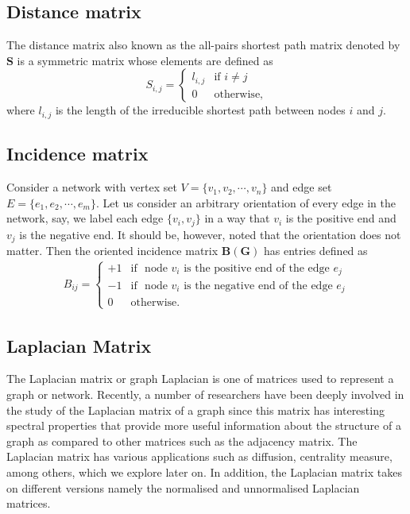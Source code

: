 \documentclass[10pt,a4paper]{article}
\begin{document}
\subsection{Distance matrix}
The distance matrix also known as the all-pairs shortest path matrix denoted by $\mathbf{S}$ is a symmetric matrix whose elements are defined as 
\begin{equation}
	S_{i,j} =  \begin{cases} l_{i,j} &\mbox{if } i \neq j \\
0 & \text{otherwise},
\end{cases}
\end{equation}
where $l_{i,j}$ is the length of the irreducible shortest path between nodes $i$ and $j$.

\subsection{Incidence matrix}
	Consider a network with vertex set $V=\{v_1,v_2, \cdots,v_n\}$ and edge set $E =\{e_1,e_2,\cdots,e_m \}$. Let us consider an arbitrary orientation of every edge in the network, say, we label each edge $\{v_i,v_j\}$ in a way that $v_i$ is the positive end and $v_j$ is the negative end. It should be, however, noted that the orientation does not matter. Then the oriented incidence matrix $\mathbf{B(G)}$ has entries defined as
	\begin{eqnarray}
	B_{ij} = \begin{cases} +1 &\mbox{if } \text{ node $v_i$ is the positive end of the edge } e_j \\
	-1 &\mbox{if }  \text{ node $v_i$ is the negative end of the edge } e_j\\
	0 & \text{otherwise}.
	\end{cases}
	\end{eqnarray}

\subsection{Laplacian Matrix}
The Laplacian matrix or graph Laplacian is one of matrices used to represent a graph or network. Recently, a number of researchers have been deeply involved in the study of the Laplacian matrix of a graph since this matrix has interesting spectral properties that provide more useful information about the structure of a graph as compared to other matrices such as the adjacency matrix. The Laplacian matrix has various applications such as diffusion, centrality measure, among others, which we explore later on. In addition, the Laplacian matrix takes on different versions namely the normalised and unnormalised Laplacian matrices.
\end{document}
